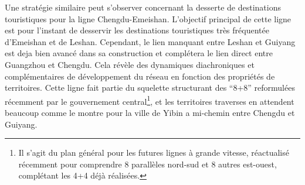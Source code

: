 {
Une stratégie similaire peut s'observer concernant la desserte de destinations touristiques pour la ligne Chengdu-Emeishan. L'objectif principal de cette ligne est pour l'instant de desservir les destinations touristiques très fréquentée d'Emeishan et de Leshan. Cependant, le lien manquant entre Leshan et Guiyang est deja bien avancé dans sa construction et complétera le lien direct entre Guangzhou et Chengdu. Cela révèle des dynamiques diachroniques et complémentaires de développement du réseau en fonction des propriétés de territoires. Cette ligne fait partie du squelette structurant des ``8+8'' reformulées récemment par le gouvernement central\footnote{Il s'agit du plan général pour les futures lignes à grande vitesse, réactualisé récemment pour comprendre 8 parallèles nord-sud et 8 autres est-ouest, complétant les 4+4 déjà réalisées.}, et les territoires traverses en attendent beaucoup comme le montre \cite{lu2012chengdu} pour la ville de Yibin a mi-chemin entre Chengdu et Guiyang.
}


